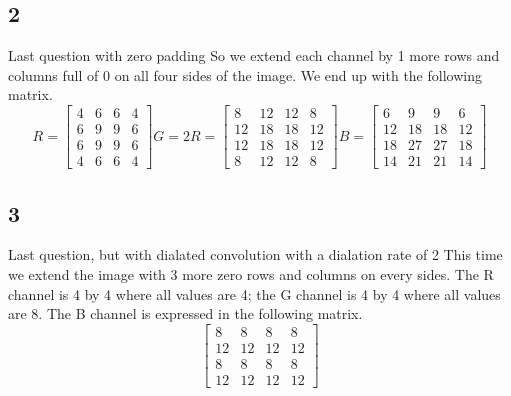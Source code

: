 \documentclass{article}
\begin{document}
\subsection*{2}
\begin{myleftlinebox}
    Last question with zero padding
    \tcbline
    So we extend each channel by 1 more rows and columns full of 0 on all four sides of the image. We end up with the following matrix.
    \begin{equation*}
        R=\begin{bmatrix}
            4 & 6 & 6 & 4\\
            6 & 9 & 9 & 6\\
            6 & 9 & 9 & 6\\
            4 & 6 & 6 & 4
        \end{bmatrix}
        G = 2R=\begin{bmatrix}
            8 & 12 & 12 & 8\\
            12 & 18 & 18 & 12\\
            12 & 18 & 18 & 12\\
            8 & 12 & 12 & 8
        \end{bmatrix}
        B=\begin{bmatrix}
            6 & 9 & 9 & 6\\
            12 & 18 & 18 & 12\\
            18 & 27 & 27 & 18\\
            14 & 21 & 21 & 14
        \end{bmatrix}
    \end{equation*}
\end{myleftlinebox}
\subsection*{3}
\begin{myleftlinebox}
    Last question, but with dialated convolution with a dialation rate of 2
    \tcbline
    This time we extend the image with 3 more zero rows and columns on every sides.  The R channel is 4 by 4 where all values are 4; the G channel is 4 by 4 where all values are 8. The B channel is expressed in the following matrix.
    \begin{equation*}
        \begin{bmatrix}
            8 & 8 & 8 & 8\\
            12 & 12 & 12 & 12\\
            8 & 8 & 8 & 8\\
            12 & 12 & 12 & 12
        \end{bmatrix}
    \end{equation*}
\end{myleftlinebox}
\end{document}

